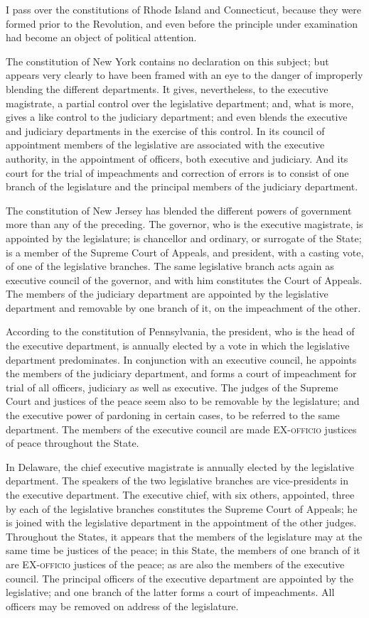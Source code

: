 I pass over the constitutions of Rhode Island and Connecticut, because they were formed prior to the Revolution, and even before the principle under examination had become an object of political attention.

The constitution of New York contains no declaration on this subject; but appears very clearly to have been framed with an eye to the danger of improperly blending the different departments. It gives, nevertheless, to the executive magistrate, a partial control over the legislative department; and, what is more, gives a like control to the judiciary department; and even blends the executive and judiciary departments in the exercise of this control. In its council of appointment members of the legislative are associated with the executive authority, in the appointment of officers, both executive and judiciary. And its court for the trial of impeachments and correction of errors is to consist of one branch of the legislature and the principal members of the judiciary department.

The constitution of New Jersey has blended the different powers of government more than any of the preceding. The governor, who is the executive magistrate, is appointed by the legislature; is chancellor and ordinary, or surrogate of the State; is a member of the Supreme Court of Appeals, and president, with a casting vote, of one of the legislative branches. The same legislative branch acts again as executive council of the governor, and with him constitutes the Court of Appeals. The members of the judiciary department are appointed by the legislative department and removable by one branch of it, on the impeachment of the other.

According to the constitution of Pennsylvania, the president, who is the head of the executive department, is annually elected by a vote in which the legislative department predominates. In conjunction with an executive council, he appoints the members of the judiciary department, and forms a court of impeachment for trial of all officers, judiciary as well as executive. The judges of the Supreme Court and justices of the peace seem also to be removable by the legislature; and the executive power of pardoning in certain cases, to be referred to the same department. The members of the executive council are made EX-\textsc{officio} justices of peace throughout the State.

In Delaware, the chief executive magistrate is annually elected by the legislative department. The speakers of the two legislative branches are vice-presidents in the executive department. The executive chief, with six others, appointed, three by each of the legislative branches constitutes the Supreme Court of Appeals; he is joined with the legislative department in the appointment of the other judges. Throughout the States, it appears that the members of the legislature may at the same time be justices of the peace; in this State, the members of one branch of it are EX-\textsc{officio} justices of the peace; as are also the members of the executive council. The principal officers of the executive department are appointed by the legislative; and one branch of the latter forms a court of impeachments. All officers may be removed on address of the legislature.

